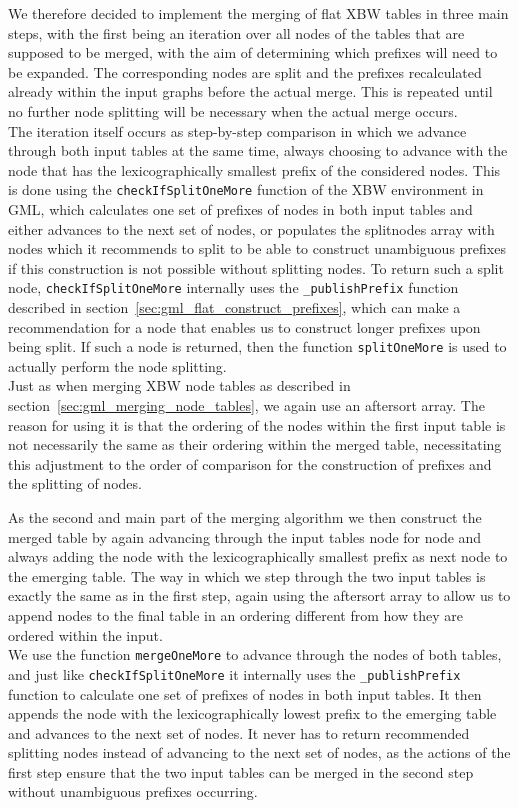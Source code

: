 \documentclass[a4paper,12pt,twoside,BCOR=10mm]{scrbook}
\begin{document}
We therefore decided to implement the merging of flat XBW tables in three main steps, 
with the first being an iteration over all nodes of the tables that are supposed to be merged, 
with the aim of determining which prefixes will need to be expanded. The corresponding nodes are 
split and the prefixes recalculated already within the input graphs before the actual merge. 
This is repeated until no further node splitting will be necessary when the actual 
merge occurs. \\
The iteration itself occurs as step-by-step comparison in which we advance through 
both input tables at the same time, always choosing to advance with the node that has the lexicographically 
smallest prefix of the considered nodes. 
This is done using the \texttt{checkIfSplitOneMore} function of the XBW environment in GML, 
which calculates one set of prefixes of nodes in both input tables 
and either advances to the next set of nodes, or populates the splitnodes array 
with nodes which it recommends to split to be able to construct unambiguous prefixes if this 
construction is not possible without splitting nodes. 
To return such a split node, \texttt{checkIfSplitOneMore} internally uses the \texttt{\_publishPrefix} function 
described in section~\ref{sec:gml_flat_construct_prefixes}, which can make a recommendation for a 
node that enables us to construct longer prefixes upon being split.
If such a node is returned, then the function \texttt{splitOneMore} is used to actually 
perform the node splitting. \\
Just as when merging XBW node tables as described in section~\ref{sec:gml_merging_node_tables}, 
we again use an aftersort array. 
The reason for using it is that the ordering of the nodes within the first input table is not necessarily the 
same as their ordering within the merged table, necessitating this adjustment to the order of comparison 
for the construction of prefixes and the splitting of nodes.

As the second and main part of the merging algorithm 
we then construct the merged table by again advancing through the 
input tables node for node and always adding the node with the lexicographically smallest prefix 
as next node to the emerging table. The way in which we step through the two input tables 
is exactly the same as in the first step, again using the aftersort array to allow us to 
append nodes to the final table in an ordering different from how they are 
ordered within the input. \\
We use the function \texttt{mergeOneMore} to advance through the nodes of both tables, 
and just like \texttt{checkIfSplitOneMore} it internally uses the \texttt{\_publishPrefix} function 
to calculate one set of prefixes of nodes in both input tables. 
It then appends the node with the lexicographically lowest prefix to the emerging table 
and advances to the next set of nodes. 
It never has to return recommended splitting nodes instead of advancing to the next 
set of nodes, as the actions of the first step ensure that the two input tables 
can be merged in the second step without unambiguous prefixes occurring.
\end{document}
